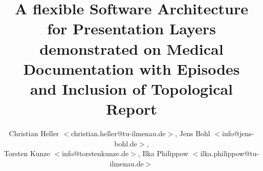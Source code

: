 %
%
%
%
%
%
%

\title{
    A flexible Software Architecture for Presentation Layers\\
    demonstrated on Medical Documentation with Episodes\\
    and Inclusion of Topological Report
}
\author{
    Christian Heller \(<\)christian.heller@tu-ilmenau.de\(>\),
    Jens Bohl \(<\)info@jens-bohl.de\(>\),\\
    Torsten Kunze \(<\)info@torstenkunze.de\(>\),
    Ilka Philippow \(<\)ilka.philippow@tu-ilmenau.de\(>\)
}

